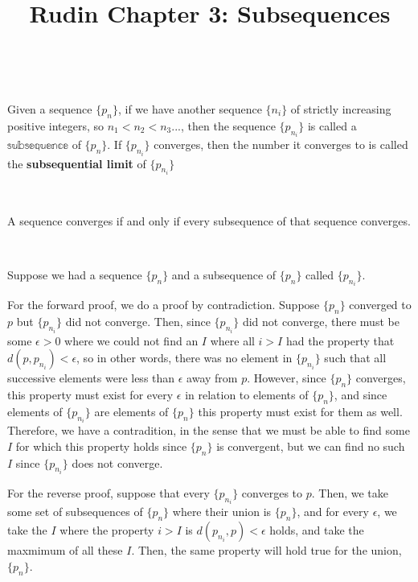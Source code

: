 \documentclass{article}
\title{Rudin Chapter 3: Subsequences}
\begin{document}
\maketitle

\begin{definition}[Subsequences]
\

Given a sequence $\{p_n\}$, if we have another sequence $\{n_i\}$ of strictly increasing positive integers, so $n_1 < n_2 < n_3 ...$, then the sequence $\{p_{n_i}\}$ is called a $\mathbb{subsequence}$ of $\{p_n\}$. If $\{p_{n_i}\}$ converges, then the number it converges to is called the \textbf{subsequential limit} of $\{p_{n_i}\}$ 
\end{definition}

\begin{theorem}
\

A sequence converges if and only if every subsequence of that sequence converges.
\end{theorem}

\begin{customproof}
\

Suppose we had a sequence $\{p_n\}$ and a subsequence of $\{p_n\}$ called $\{p_{n_i}\}$. 

For the forward proof, we do a proof by contradiction. Suppose $\{p_n\}$ converged to $p$ but $\{p_{n_i}\}$ did not converge. Then, since $\{p_{n_i}\}$ did not converge, there must be some $\epsilon >0$ where we could not find an $I$ where all $i > I$ had the property that $d(p, p_{n_i}) < \epsilon$, so in other words, there was no element in $\{p_{n_i}\}$ such that all successive elements were less than $\epsilon$ away from $p$. However, since $\{p_n\}$ converges, this property must exist for every $\epsilon$ in relation to elements of $\{p_n\}$, and since elements of $\{p_{n_i}\}$ are elements of $\{p_n\}$ this property must exist for them as well. Therefore, we have a contradition, in the sense that we must be able to find some $I$ for which this property holds since $\{p_n\}$ is convergent, but we can find no such $I$ since $\{p_{n_i}\}$ does not converge.

For the reverse proof, suppose that every $\{p_{n_i}\}$ converges to $p$. Then, we take some set of subsequences of $\{p_n\}$ where their union is $\{p_n\}$, and for every $\epsilon$, we take the $I$ where the property $i > I$ is $d(p_{n_i}, p) < \epsilon$ holds, and take the maxmimum of all these $I$. Then, the same property will hold true for the union, $\{p_n\}$. 
\end{customproof}
\end{document}
